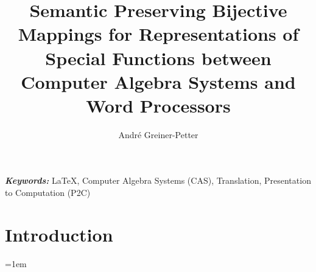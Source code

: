 \documentclass[a4paper,11pt]{article}
\title{
    Semantic Preserving Bijective Mappings for Representations of Special Functions between Computer Algebra Systems and Word Processors
}
\author{Andr\'e Greiner-Petter}
\affil{
	Information Science Group, University of Konstanz, Germany\\
	\url{andre.greiner-petter@t-online.de}
}
\date{} %
\begin{document}
\maketitle

\glsresetall

\noindent
{\it \bf Keywords:} LaTeX, Computer Algebra Systems (CAS), Translation, Presentation to Computation (P2C)



\section{Introduction}


%
%
%
%

%
%
%
%

%
%
%

%

%

%
%

\emergencystretch=1em
\printbibliography
\end{document}
